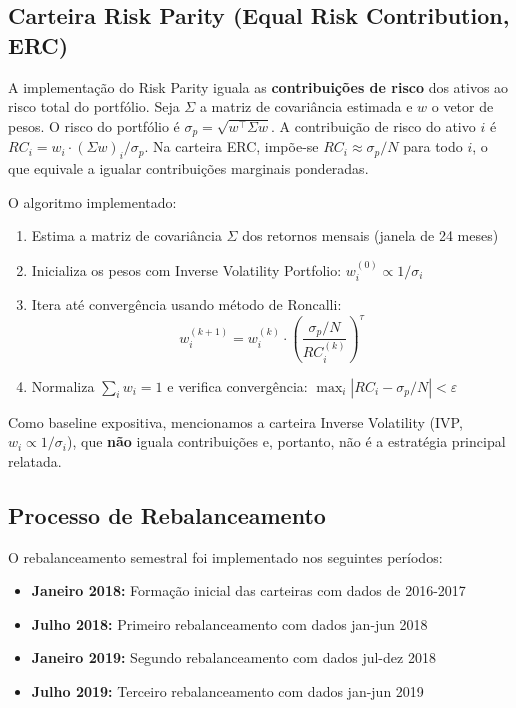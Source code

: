 \subsection{Carteira Risk Parity (Equal Risk Contribution, ERC)}

A implementação do Risk Parity iguala as \textbf{contribuições de risco} dos ativos ao risco total do portfólio. Seja $\Sigma$ a matriz de covariância estimada e $w$ o vetor de pesos. O risco do portfólio é $\sigma_p = \sqrt{w^\top \Sigma w}$. A contribuição de risco do ativo $i$ é $RC_i = w_i \cdot (\Sigma w)_i / \sigma_p$. Na carteira ERC, impõe-se $RC_i \approx \sigma_p / N$ para todo $i$, o que equivale a igualar contribuições marginais ponderadas.

O algoritmo implementado:
\begin{enumerate}
    \item Estima a matriz de covariância $\Sigma$ dos retornos mensais (janela de 24 meses)
    \item Inicializa os pesos com Inverse Volatility Portfolio: $w_i^{(0)} \propto 1/\sigma_i$
    \item Itera até convergência usando método de Roncalli:
    \begin{equation}
    w_i^{(k+1)} = w_i^{(k)} \cdot \left( \frac{\sigma_p / N}{RC_i^{(k)}} \right)^\tau
    \end{equation}
    \item Normaliza $\sum_i w_i = 1$ e verifica convergência: $\max_i |RC_i - \sigma_p/N| < \varepsilon$
\end{enumerate}

Como baseline expositiva, mencionamos a carteira Inverse Volatility (IVP, $w_i \propto 1/\sigma_i$), que \textbf{não} iguala contribuições e, portanto, não é a estratégia principal relatada.

\subsection{Processo de Rebalanceamento}

O rebalanceamento semestral foi implementado nos seguintes períodos:
\begin{itemize}
    \item \textbf{Janeiro 2018:} Formação inicial das carteiras com dados de 2016-2017
    \item \textbf{Julho 2018:} Primeiro rebalanceamento com dados jan-jun 2018
    \item \textbf{Janeiro 2019:} Segundo rebalanceamento com dados jul-dez 2018
    \item \textbf{Julho 2019:} Terceiro rebalanceamento com dados jan-jun 2019
\end{itemize}

